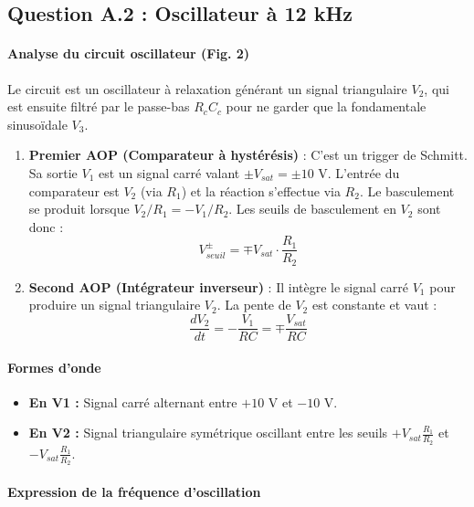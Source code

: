\documentclass[11pt,a4paper]{article}
\begin{document}
\subsection{Question A.2 : Oscillateur à 12 kHz}

\paragraph{Analyse du circuit oscillateur (Fig. 2)}

Le circuit est un oscillateur à relaxation générant un signal triangulaire $V_2$, qui est ensuite filtré par le passe-bas $R_c C_c$ pour ne garder que la fondamentale sinusoïdale $V_3$.

\begin{enumerate}
    \item \textbf{Premier AOP (Comparateur à hystérésis)} : C'est un trigger de Schmitt. Sa sortie $V_1$ est un signal carré valant $\pm V_{sat} = \pm 10$ V. L'entrée du comparateur est $V_2$ (via $R_1$) et la réaction s'effectue via $R_2$. Le basculement se produit lorsque $V_2/R_1 = -V_1/R_2$.
    Les seuils de basculement en $V_2$ sont donc :
    \begin{equation}
    V_{seuil}^{\pm} = \mp V_{sat} \cdot \frac{R_1}{R_2}
    \end{equation}
    
    \item \textbf{Second AOP (Intégrateur inverseur)} : Il intègre le signal carré $V_1$ pour produire un signal triangulaire $V_2$. La pente de $V_2$ est constante et vaut :
    \begin{equation}
    \frac{dV_2}{dt} = -\frac{V_1}{RC} = \mp \frac{V_{sat}}{RC}
    \end{equation}
\end{enumerate}

\paragraph{Formes d'onde}
\begin{itemize}
    \item \textbf{En V1 :} Signal carré alternant entre $+10$ V et $-10$ V.
    \item \textbf{En V2 :} Signal triangulaire symétrique oscillant entre les seuils $+V_{sat} \frac{R_1}{R_2}$ et $-V_{sat} \frac{R_1}{R_2}$.
\end{itemize}

\paragraph{Expression de la fréquence d'oscillation}
\end{document}
